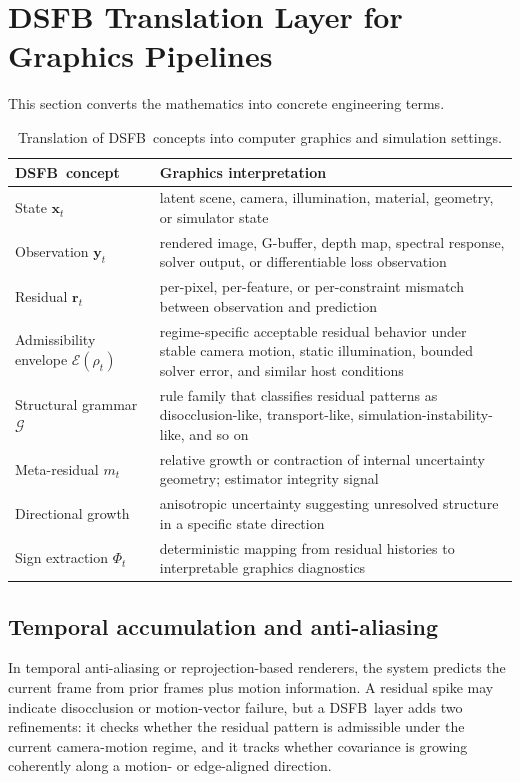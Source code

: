 \documentclass[11pt]{article}
\newcommand{\dsfb}{\textsc{DSFB}}
\newcommand{\admiss}{\mathcal{E}}
\newcommand{\grammar}{\mathcal{G}}
\newcommand{\state}{\mathbf{x}}
\newcommand{\obs}{\mathbf{y}}
\newcommand{\resid}{\mathbf{r}}
\newcommand{\metares}{m}
\theoremstyle{definition}
\theoremstyle{plain}
\begin{document}
\section{DSFB Translation Layer for Graphics Pipelines}

This section converts the mathematics into concrete engineering terms.

\begin{table}[H]
\centering
\caption{Translation of \dsfb\ concepts into computer graphics and simulation settings.}
\label{tab:translation}
\begin{tabularx}{\textwidth}{>{\raggedright\arraybackslash}p{} >{\raggedright\arraybackslash}X}
\toprule
\textbf{\dsfb\ concept} & \textbf{Graphics interpretation} \\
\midrule
State $\state_t$ & latent scene, camera, illumination, material, geometry, or simulator state \\
Observation $\obs_t$ & rendered image, G-buffer, depth map, spectral response, solver output, or differentiable loss observation \\
Residual $\resid_t$ & per-pixel, per-feature, or per-constraint mismatch between observation and prediction \\
Admissibility envelope $\admiss(\rho_t)$ & regime-specific acceptable residual behavior under stable camera motion, static illumination, bounded solver error, and similar host conditions \\
Structural grammar $\grammar$ & rule family that classifies residual patterns as disocclusion-like, transport-like, simulation-instability-like, and so on \\
Meta-residual $\metares_t$ & relative growth or contraction of internal uncertainty geometry; estimator integrity signal \\
Directional growth & anisotropic uncertainty suggesting unresolved structure in a specific state direction \\
Sign extraction $\Phi_t$ & deterministic mapping from residual histories to interpretable graphics diagnostics \\
\bottomrule
\end{tabularx}
\end{table}

\subsection{Temporal accumulation and anti-aliasing}
In temporal anti-aliasing or reprojection-based renderers, the system predicts the current frame from prior frames plus motion information. A residual spike may indicate disocclusion or motion-vector failure, but a \dsfb\ layer adds two refinements: it checks whether the residual pattern is admissible under the current camera-motion regime, and it tracks whether covariance is growing coherently along a motion- or edge-aligned direction.
\end{document}
